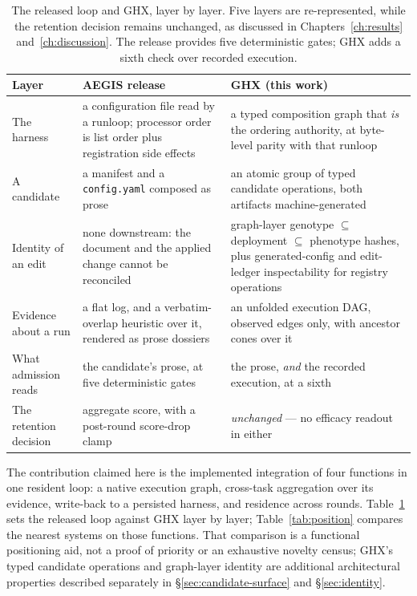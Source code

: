 \begin{table}[t]
\centering\small
\setlength{\tabcolsep}{5pt}
\renewcommand{\arraystretch}{1.3}
\begin{tabular}{@{}p{2.5cm} p{4.6cm} p{4.9cm}@{}}
\toprule
\textbf{Layer} & \textbf{AEGIS release~\cite{aegis}} & \textbf{GHX (this work)} \\
\midrule
The harness &
  a configuration file read by a runloop; processor order is list order
  plus registration side effects &
  a typed composition graph that \emph{is} the ordering authority, at
  byte-level parity with that runloop \\
A candidate &
  a manifest and a \texttt{config.yaml} composed as prose &
  an atomic group of typed candidate operations, both artifacts
  machine-generated \\
Identity of an edit &
  none downstream: the document and the applied change cannot be
  reconciled &
  graph-layer genotype $\subseteq$ deployment $\subseteq$ phenotype hashes,
  plus generated-config and edit-ledger inspectability for registry operations \\
Evidence about a run &
  a flat log, and a verbatim-overlap heuristic over it, rendered as prose
  dossiers &
  an unfolded execution DAG, observed edges only, with ancestor cones over
  it \\
What admission reads &
  the candidate's prose, at five deterministic gates &
  the prose, \emph{and} the recorded execution, at a sixth \\
The retention decision &
  aggregate score, with a post-round score-drop clamp &
  \emph{unchanged} --- no efficacy readout in either \\
\bottomrule
\end{tabular}
\caption[The released loop against GHX, layer by layer]{The released loop
and GHX, layer by layer. Five layers are re-represented, while the
retention decision remains unchanged, as discussed in
Chapters~\ref{ch:results} and~\ref{ch:discussion}. The release provides
five deterministic gates; GHX adds a sixth check over recorded execution.}
\label{tab:layers}
\end{table}

The contribution claimed here is the implemented integration of four
functions in one resident loop: a native execution graph, cross-task
aggregation over its evidence, write-back to a persisted harness, and
residence across rounds. Table~\ref{tab:layers} sets the released loop
against GHX layer by layer; Table~\ref{tab:position} compares the nearest
systems on those functions. That comparison is a functional positioning aid, not a proof
of priority or an exhaustive novelty census; GHX's typed candidate
operations and graph-layer identity are additional architectural properties
described separately in \S\ref{sec:candidate-surface} and
\S\ref{sec:identity}.

